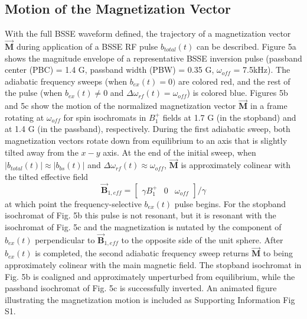 \documentclass{article}
\newcommand{\bfullt}{b_{total}(t)}
\newcommand{\bext}{b_{ex}(t)}
\newcommand{\bbst}{b_{bs}(t)}
\begin{document}
\subsection*{Motion of the Magnetization Vector}
With the full BSSE waveform defined, 
the trajectory of a magnetization vector $\overrightarrow{\textbf{M}}$ 
during application of a BSSE RF pulse $\bfullt$ can be described. 
Figure 5a shows the magnitude envelope of a representative BSSE inversion pulse (passband center (PBC) = 1.4 G, passband width (PBW) = 0.35 G, $\omega_{off}$ = 7.5kHz). 
The adiabatic frequency sweeps (when $\bext = 0)$ are colored red, 
and the rest of the pulse (when $\bext \neq 0$ and $\Delta \omega_{rf}(t) = \omega_{off}$) is colored blue. 
Figures 5b and 5c show the motion of the normalized magnetization vector $\overrightarrow{\textbf{M}}$ in a frame rotating at $\omega_{off}$ for spin isochromats in $B_1^+$ fields at 1.7 G (in the stopband) and at 1.4 G (in the passband), respectively. 
During the first adiabatic sweep, both magnetization vectors rotate down from equilibrium
to an axis that is slightly tilted away from the $x-y$ axis.
At the end of the initial sweep, when $|\bfullt| \approx |\bbst|$ and $\Delta \omega_{rf}(t) \approx \omega_{off}$, 
$\overrightarrow{\textbf{M}}$ is approximately colinear with the tilted effective field
\begin{equation*}
    \overrightarrow{\textbf{B}}_{1,eff} = \left[\begin{array}{ccc} \gamma B_1^+ & 0 & \omega_{off}\end{array}\right]/\gamma
\end{equation*}
at which point the frequency-selective $\bext$ pulse begins. 
For the stopband isochromat of Fig. 5b this pulse is not resonant, 
but it is resonant with the isochromat of Fig. 5c 
and the magnetization is nutated by the component of $\bext$ perpendicular to $\overrightarrow{\textbf{B}}_{1,eff}$ 
to the opposite side of the unit sphere.
After $\bext$ is completed, the second adiabatic frequency sweep returns $\overrightarrow{\textbf{M}}$ to being approximately colinear with the main magnetic field. 
The stopband isochromat in Fig. 5b is coaligned and approximately unperturbed from equilibrium, 
while the passband isochromat of Fig. 5c  is successfully inverted.
An animated figure illustrating the magnetization motion is included as Supporting Information Fig S1.
\end{document}
